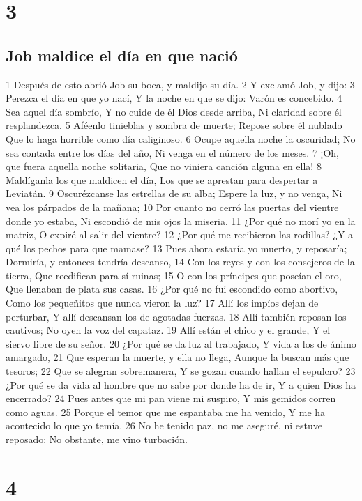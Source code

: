 \chapter{3}

\section*{Job maldice el día en que nació}

1 Después de esto abrió Job su boca, y maldijo su día. 
2 Y exclamó Job, y dijo:
3 Perezca el día en que yo nací,
Y la noche en que se dijo: Varón es concebido.
4 Sea aquel día sombrío,
Y no cuide de él Dios desde arriba,
Ni claridad sobre él resplandezca.
5 Aféenlo tinieblas y sombra de muerte;
Repose sobre él nublado
Que lo haga horrible como día caliginoso.
6 Ocupe aquella noche la oscuridad;
No sea contada entre los días del año,
Ni venga en el número de los meses.
7 ¡Oh, que fuera aquella noche solitaria,
Que no viniera canción alguna en ella!
8 Maldíganla los que maldicen el día,
Los que se aprestan para despertar a Leviatán.
9 Oscurézcanse las estrellas de su alba;
Espere la luz, y no venga,
Ni vea los párpados de la mañana;
10 Por cuanto no cerró las puertas del vientre donde yo estaba,
Ni escondió de mis ojos la miseria.
11 ¿Por qué no morí yo en la matriz,
O expiré al salir del vientre?
12 ¿Por qué me recibieron las rodillas?
¿Y a qué los pechos para que mamase?
13 Pues ahora estaría yo muerto, y reposaría;
Dormiría, y entonces tendría descanso,
14 Con los reyes y con los consejeros de la tierra,
Que reedifican para sí ruinas;
15 O con los príncipes que poseían el oro,
Que llenaban de plata sus casas.
16 ¿Por qué no fui escondido como abortivo,
Como los pequeñitos que nunca vieron la luz?
17 Allí los impíos dejan de perturbar,
Y allí descansan los de agotadas fuerzas.
18 Allí también reposan los cautivos;
No oyen la voz del capataz.
19 Allí están el chico y el grande,
Y el siervo libre de su señor. 
20 ¿Por qué se da luz al trabajado,
Y vida a los de ánimo amargado,
21 Que esperan la muerte, y ella no llega, 
Aunque la buscan más que tesoros; 
22 Que se alegran sobremanera,
Y se gozan cuando hallan el sepulcro?
23 ¿Por qué se da vida al hombre que no sabe por donde ha de ir,
Y a quien Dios ha encerrado?
24 Pues antes que mi pan viene mi suspiro,
Y mis gemidos corren como aguas.
25 Porque el temor que me espantaba me ha venido,
Y me ha acontecido lo que yo temía.
26 No he tenido paz, no me aseguré, ni estuve reposado;
No obstante, me vino turbación.

\chapter{4}

